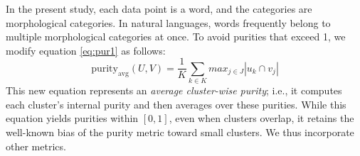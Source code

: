 In the present study, each data point is a word, and the categories are morphological categories. In natural languages, words frequently belong to multiple morphological categories at once.
To avoid purities that exceed 1, we modify equation \eqref{eq:pur1} as follows: 
\begin{equation} \label{eq:pur2}
\text{purity}_{\text{avg}}(U, V) =  \frac{1}{K} \sum_{k \in K} max_{j \in J} |u_k \cap v_j|
\end{equation}
This new equation represents an \emph{average cluster-wise purity}; i.e., it computes each cluster's internal purity and then averages over these purities. %
While this equation yields purities within $[0, 1]$, even 
when clusters overlap, it retains the well-known bias of the purity metric toward small clusters. We thus incorporate other metrics. 

